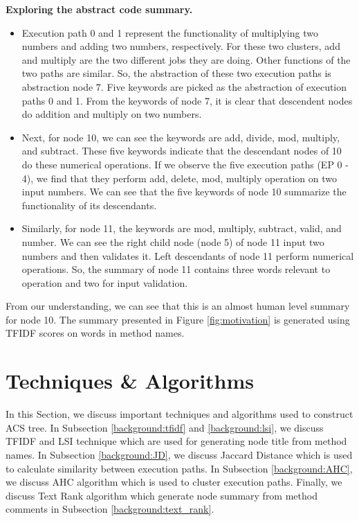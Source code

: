 \textbf{Exploring the abstract code summary.}
\begin{itemize}
    \item Execution path 0 and 1 represent the functionality of multiplying two numbers and adding two numbers, respectively. For these two clusters, add and multiply are the two different jobs they are doing. Other functions of the two paths are similar. So, the abstraction of these two execution paths is abstraction node 7. Five keywords are picked as the abstraction of execution paths 0 and 1. From the keywords of node 7, it is clear that descendent nodes do addition and multiply on two numbers.
    \item Next, for node 10, we can see the keywords are add, divide, mod, multiply, and subtract. These five keywords indicate that the descendant nodes of 10 do these numerical operations. If we observe the five execution paths (EP 0 - 4), we find that they perform add, delete, mod, multiply operation on two input numbers. We can see that the five keywords of node 10 summarize the functionality of its descendants.
    \item Similarly, for node 11, the keywords are mod, multiply, subtract, valid, and number. We can see the right child node (node 5) of node 11 input two numbers and then validates it. Left descendants of node 11 perform numerical operations. So, the summary of node 11 contains three words relevant to operation and two for input validation.
\end{itemize}
   From our understanding, we can see that this is an almost human level summary for node 10. The summary presented in Figure \ref{fig:motivation} is generated using TFIDF scores on words in method names. 

\section{ Techniques \& Algorithms}
\label{background:techniques}
In this Section, we discuss important techniques and algorithms used to construct ACS tree. In Subsection \ref{background:tfidf} and \ref{background:lsi}, we discuss TFIDF and LSI technique which are used for generating node title from method names. In Subsection \ref{background:JD}, we discuss Jaccard Distance which is used to calculate similarity between execution paths. In Subsection \ref{background:AHC}, we discuss AHC algorithm which is used to cluster execution paths. Finally, we discuss Text Rank algorithm which generate node summary from method comments in Subsection \ref{background:text_rank}.

